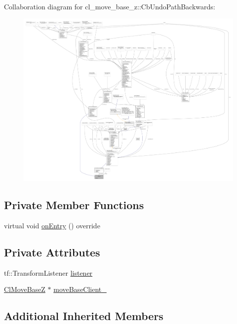 Collaboration diagram for cl\+\_\+move\+\_\+base\+\_\+z\+:\+:Cb\+Undo\+Path\+Backwards\+:
\nopagebreak
\begin{figure}[H]
\begin{center}
\leavevmode
\includegraphics[width=350pt]{classcl__move__base__z_1_1CbUndoPathBackwards__coll__graph}
\end{center}
\end{figure}
\subsection*{Private Member Functions}
\begin{DoxyCompactItemize}
\item 
virtual void \hyperlink{classcl__move__base__z_1_1CbUndoPathBackwards_a32e680530375b62c7053bf173f6b2b1b}{on\+Entry} () override
\end{DoxyCompactItemize}
\subsection*{Private Attributes}
\begin{DoxyCompactItemize}
\item 
tf\+::\+Transform\+Listener \hyperlink{classcl__move__base__z_1_1CbUndoPathBackwards_add2b6a0f1c19654a0cf07209fc123a71}{listener}
\item 
\hyperlink{classcl__move__base__z_1_1ClMoveBaseZ}{Cl\+Move\+BaseZ} $\ast$ \hyperlink{classcl__move__base__z_1_1CbUndoPathBackwards_a306d616dab00f50141abed4bfb47aeb2}{move\+Base\+Client\+\_\+}
\end{DoxyCompactItemize}
\subsection*{Additional Inherited Members}



